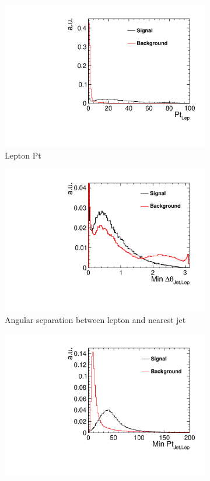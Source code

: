 \begin{figure}[]\ContinuedFloat
    \begin{subfigure}[]{0.5\linewidth}
    \centering
    \includegraphics[width=0.75\linewidth]{Appendix/figures/LepPt} 
    \caption{Lepton Pt} 
  \end{subfigure}%
  \begin{subfigure}[]{0.5\linewidth}
    \centering
    \includegraphics[width=0.75\linewidth]{Appendix/figures/MinJetLepAngSep} 
    \caption{Angular separation between lepton and nearest jet} 
  \end{subfigure}
  \begin{subfigure}[]{0.5\linewidth}
    \centering
    \includegraphics[width=0.75\linewidth]{Appendix/figures/MinJetLepPt} 

\end{subfigure}
\end{figure}
